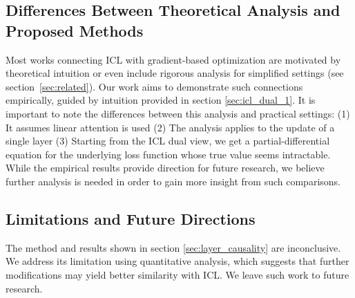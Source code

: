 \subsection{Differences Between Theoretical Analysis and Proposed Methods}
Most works connecting ICL with gradient-based optimization are motivated by theoretical intuition or even include rigorous analysis for simplified settings \cite{pmlr-v202-von-oswald23a, akyürek2023learning} (see section~\ref{sec:related}).
Our work aims to demonstrate such connections empirically, guided by intuition provided in section \ref{sec:icl_dual_1}.  
It is important to note the differences between this analysis and practical settings: (1) It assumes linear attention is used (2) The analysis applies to the update of a single layer
(3) Starting from the ICL dual view, we get a partial-differential equation for the underlying loss function whose true value seems intractable.
While the empirical results provide direction for future research, we believe further analysis is needed in order to gain more insight from such comparisons. 

\subsection{Limitations and Future Directions}
The method and results shown in section \ref{sec:layer_causality} are inconclusive.
We address its limitation using quantitative analysis, which suggests that further modifications may yield better similarity with ICL.
We leave such work to future research.  